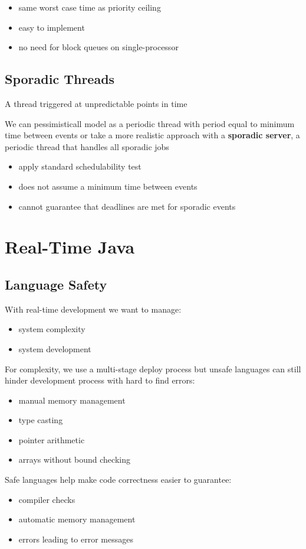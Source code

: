 \documentclass[]{article}
\theoremstyle{definition}
\begin{document}
	\begin{itemize}
		\item same worst case time as priority ceiling
		\item easy to implement
		\item no need for block queues on single-processor
	\end{itemize}
	
	\subsection{Sporadic Threads}
	A thread triggered at unpredictable points in time

	We can pessimisticall model as a periodic thread with period equal to minimum time between events or take a more realistic approach with a \textbf{sporadic server}, a periodic thread that handles all sporadic jobs
	\begin{itemize}
		\item apply standard schedulability test
		\item does not assume a minimum time between events
		\item cannot guarantee that deadlines are met for sporadic events
	\end{itemize}


	\section{Real-Time Java}

	\subsection{Language Safety}
	With real-time development we want to manage:
	\begin{itemize}
		\item system complexity
		\item system development
	\end{itemize}

	For complexity, we use a multi-stage deploy process but unsafe languages can still hinder development process with hard to find errors:
	\begin{itemize}
		\item manual memory management
		\item type casting
		\item pointer arithmetic
		\item arrays without bound checking
	\end{itemize}
	Safe languages help make code correctness easier to guarantee:
	\begin{itemize}
		\item compiler checks
		\item automatic memory management
		\item errors leading to error messages
	\end{itemize}
\end{document}
